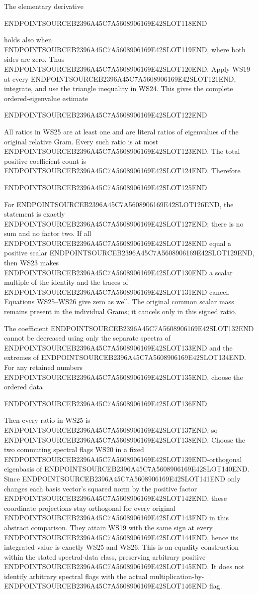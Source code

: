 The elementary derivative

ENDPOINTSOURCEB2396A45C7A5608906169E42SLOT118END

holds also when ENDPOINTSOURCEB2396A45C7A5608906169E42SLOT119END, where both sides are zero. Thus ENDPOINTSOURCEB2396A45C7A5608906169E42SLOT120END. Apply WS19 at every ENDPOINTSOURCEB2396A45C7A5608906169E42SLOT121END, integrate, and use the triangle inequality in WS24. This gives the complete ordered-eigenvalue estimate

ENDPOINTSOURCEB2396A45C7A5608906169E42SLOT122END

All ratios in WS25 are at least one and are literal ratios of eigenvalues of the original relative Gram. Every such ratio is at most ENDPOINTSOURCEB2396A45C7A5608906169E42SLOT123END. The total positive coefficient count is ENDPOINTSOURCEB2396A45C7A5608906169E42SLOT124END. Therefore

ENDPOINTSOURCEB2396A45C7A5608906169E42SLOT125END

For ENDPOINTSOURCEB2396A45C7A5608906169E42SLOT126END, the statement is exactly ENDPOINTSOURCEB2396A45C7A5608906169E42SLOT127END; there is no sum and no factor two. If all ENDPOINTSOURCEB2396A45C7A5608906169E42SLOT128END equal a positive scalar ENDPOINTSOURCEB2396A45C7A5608906169E42SLOT129END, then WS23 makes ENDPOINTSOURCEB2396A45C7A5608906169E42SLOT130END a scalar multiple of the identity and the traces of ENDPOINTSOURCEB2396A45C7A5608906169E42SLOT131END cancel. Equations WS25--WS26 give zero as well. The original common scalar mass remains present in the individual Grams; it cancels only in this signed ratio.

The coefficient ENDPOINTSOURCEB2396A45C7A5608906169E42SLOT132END cannot be decreased using only the separate spectra of ENDPOINTSOURCEB2396A45C7A5608906169E42SLOT133END and the extremes of ENDPOINTSOURCEB2396A45C7A5608906169E42SLOT134END. For any retained numbers ENDPOINTSOURCEB2396A45C7A5608906169E42SLOT135END, choose the ordered data

ENDPOINTSOURCEB2396A45C7A5608906169E42SLOT136END

Then every ratio in WS25 is ENDPOINTSOURCEB2396A45C7A5608906169E42SLOT137END, so ENDPOINTSOURCEB2396A45C7A5608906169E42SLOT138END. Choose the two commuting spectral flags WS20 in a fixed ENDPOINTSOURCEB2396A45C7A5608906169E42SLOT139END-orthogonal eigenbasis of ENDPOINTSOURCEB2396A45C7A5608906169E42SLOT140END. Since ENDPOINTSOURCEB2396A45C7A5608906169E42SLOT141END only changes each basis vector's squared norm by the positive factor ENDPOINTSOURCEB2396A45C7A5608906169E42SLOT142END, these coordinate projections stay orthogonal for every original ENDPOINTSOURCEB2396A45C7A5608906169E42SLOT143END in this abstract comparison. They attain WS19 with the same sign at every ENDPOINTSOURCEB2396A45C7A5608906169E42SLOT144END, hence its integrated value is exactly WS25 and WS26. This is an equality construction within the stated spectral-data class, preserving arbitrary positive ENDPOINTSOURCEB2396A45C7A5608906169E42SLOT145END. It does not identify arbitrary spectral flags with the actual multiplication-by-ENDPOINTSOURCEB2396A45C7A5608906169E42SLOT146END flag.

